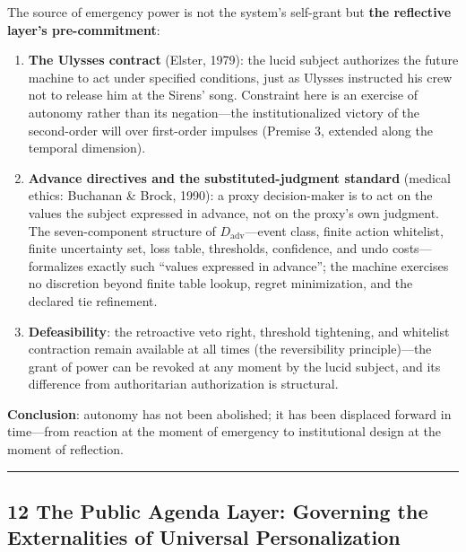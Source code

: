 \documentclass[
  11pt]{article}
\providecommand{\tightlist}{%
  \setlength{\itemsep}{0pt}\setlength{\parskip}{0pt}}
\begin{document}
The source of emergency power is not the system's self-grant but
\textbf{the reflective layer's pre-commitment}:

\begin{enumerate}
\def\labelenumi{\arabic{enumi}.}
\tightlist
\item
  \textbf{The Ulysses contract} (Elster, 1979): the lucid subject
  authorizes the future machine to act under specified conditions, just
  as Ulysses instructed his crew not to release him at the Sirens' song.
  Constraint here is an exercise of autonomy rather than its
  negation---the institutionalized victory of the second-order will over
  first-order impulses (Premise 3, extended along the temporal
  dimension).
\item
  \textbf{Advance directives and the substituted-judgment standard}
  (medical ethics: Buchanan \& Brock, 1990): a proxy decision-maker is
  to act on the values the subject expressed in advance, not on the
  proxy's own judgment. The seven-component structure of
  \(D_{\mathrm{adv}}\)---event class, finite action whitelist, finite
  uncertainty set, loss table, thresholds, confidence, and undo
  costs---formalizes exactly such ``values expressed in advance''; the
  machine exercises no discretion beyond finite table lookup, regret
  minimization, and the declared tie refinement.
\item
  \textbf{Defeasibility}: the retroactive veto right, threshold
  tightening, and whitelist contraction remain available at all times
  (the reversibility principle)---the grant of power can be revoked at
  any moment by the lucid subject, and its difference from authoritarian
  authorization is structural.
\end{enumerate}

\textbf{Conclusion}: autonomy has not been abolished; it has been
displaced forward in time---from reaction at the moment of emergency to
institutional design at the moment of reflection.

\begin{center}\rule{0.5\linewidth}{0.5pt}\end{center}

\subsection{12 The Public Agenda Layer: Governing the Externalities of
Universal
Personalization}\label{the-public-agenda-layer-governing-the-externalities-of-universal-personalization}
\end{document}
